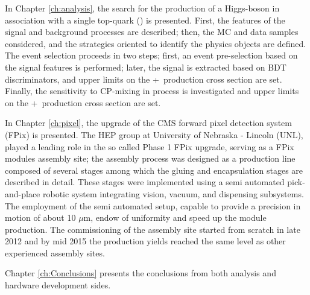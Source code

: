 
In Chapter \ref{ch:analysis}, the search for the production of a Higgs-boson in association with a single top-quark (\tH) is presented. First, the features of the signal and background processes are described; then, the MC and data samples considered, and the strategies oriented to identify the physics objects are defined. The event selection proceeds in two steps; first, an event pre-selection based on the signal features is performed; later, the signal is extracted based on BDT discriminators, and upper limits on the \tH+\ttH\ production cross section are set. Finally, the  sensitivity to CP-mixing in \tH process is investigated and upper limits on the \tH+\ttH\ production cross section are set.   

In Chapter \ref{ch:pixel}, the upgrade of the CMS forward pixel detection system (FPix) is presented. The HEP group at University of Nebraska - Lincoln (UNL), played a leading role in the so called Phase 1 FPix upgrade, serving as a FPix modules assembly site; the assembly process was designed as a production line composed of several stages among which the gluing and encapsulation stages are described in detail. These stages were implemented using a semi automated pick-and-place robotic system integrating vision, vacuum, and dispensing subsystems. The employment of the semi automated setup, capable to provide a precision in motion of about 10 $\mu$m, endow of uniformity and speed up the module production. The commissioning of the assembly site started from scratch in late 2012 and by mid 2015 the production yields reached the same level as other experienced assembly sites.

Chapter \ref{ch:Conclusions} presents the conclusions from both analysis and hardware development sides.

